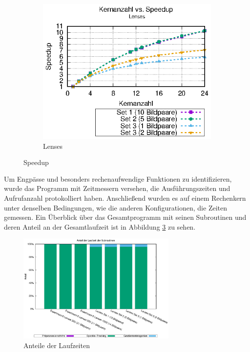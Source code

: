\begin{center}
\begin{figure}
\begin{subfigure}[b]{0.49\textwidth}
			\includegraphics[width=\textwidth]{pdf/speedup_lenses}
			\caption[Lenses]{Lenses}
			\label{fig:speedup_lenses}
		\end{subfigure}
		\caption{Speedup}
		\label{fig:speedup}
	\end{figure}
\end{center}

Um Engpässe und besonders rechenaufwendige Funktionen zu identifizieren, wurde das Programm mit Zeitmessern versehen, die Ausführungszeiten und Aufrufanzahl protokolliert haben. Anschließend wurden es auf einem Rechenkern unter denselben Bedingungen, wie die anderen Konfigurationen, die Zeiten gemessen. Ein Überblick über das Gesamtprogramm mit seinen Subroutinen und deren Anteil an der Gesamtlaufzeit ist in Abbildung \ref{fig:perc_main} zu sehen.

\begin{center}
	\begin{figure}[htbp]
		\centering
		\includegraphics[width=0.7\textwidth]{pdf/main}
		\caption{Anteile der Laufzeiten}
		\label{fig:perc_main}
	\end{figure}
\end{center}


